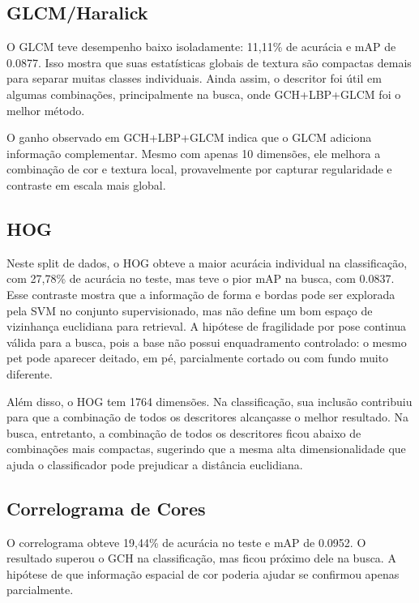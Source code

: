\documentclass[12pt,a4paper]{article}
\begin{document}
\subsection{GLCM/Haralick}

O GLCM teve desempenho baixo isoladamente: 11,11\% de acurácia e mAP de 0.0877. Isso mostra que suas estatísticas globais de textura são compactas demais para separar muitas classes individuais. Ainda assim, o descritor foi útil em algumas combinações, principalmente na busca, onde GCH+LBP+GLCM foi o melhor método.

O ganho observado em GCH+LBP+GLCM indica que o GLCM adiciona informação complementar. Mesmo com apenas 10 dimensões, ele melhora a combinação de cor e textura local, provavelmente por capturar regularidade e contraste em escala mais global.

\subsection{HOG}

Neste split de dados, o HOG obteve a maior acurácia individual na classificação, com 27,78\% de acurácia no teste, mas teve o pior mAP na busca, com 0.0837. Esse contraste mostra que a informação de forma e bordas pode ser explorada pela SVM no conjunto supervisionado, mas não define um bom espaço de vizinhança euclidiana para retrieval. A hipótese de fragilidade por pose continua válida para a busca, pois a base não possui enquadramento controlado: o mesmo pet pode aparecer deitado, em pé, parcialmente cortado ou com fundo muito diferente.

Além disso, o HOG tem 1764 dimensões. Na classificação, sua inclusão contribuiu para que a combinação de todos os descritores alcançasse o melhor resultado. Na busca, entretanto, a combinação de todos os descritores ficou abaixo de combinações mais compactas, sugerindo que a mesma alta dimensionalidade que ajuda o classificador pode prejudicar a distância euclidiana.

\subsection{Correlograma de Cores}

O correlograma obteve 19,44\% de acurácia no teste e mAP de 0.0952. O resultado superou o GCH na classificação, mas ficou próximo dele na busca. A hipótese de que informação espacial de cor poderia ajudar se confirmou apenas parcialmente.
\end{document}
